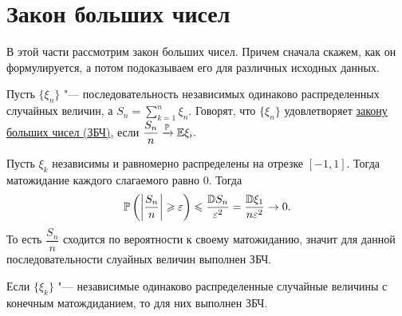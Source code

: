 \documentclass[../TV&MS.tex]{subfiles}
\begin{document}
    
\section{Закон больших чисел}
В этой части рассмотрим закон больших чисел. Причем сначала скажем, как он формулируется, а потом подоказываем его для различных исходных данных.

\begin{Def}
    Пусть $\{\xi_n\}$ "--- последовательность независимых одинаково распределенных случайных величин, а $S_n = \sum\limits_{k=1}^{n} \xi_n$.
    Говорят, что $\{\xi_n\}$ удовлетворяет \uline{закону больших чисел (ЗБЧ)}, если $\dfrac{S_n}{n} \xrightarrow[]{\mathbb{P}} \mathbb{E} \xi_i.$ 
\end{Def} 

\begin{Ex}
    Пусть $\xi_k$ независимы и равномерно распределены на отрезке $[-1, 1]$. Тогда матожидание каждого слагаемого равно $0$. Тогда
    \[
        \mathbb{P} \left( \left| \dfrac{S_n}{n} \right| \geqslant \varepsilon \right) \leqslant \dfrac{\mathbb{D} S_n}{\varepsilon^2} = \dfrac{\mathbb{D} \xi_1}{n \varepsilon^2} \rightarrow 0 
    .\]
    То есть $\dfrac{S_n}{n}$ сходится по вероятности к своему матожиданию, значит для данной последовательности слуайных величин выполнен ЗБЧ.
\end{Ex} 

\begin{Th}
    Если $\{ \xi_k \}$ "--- независимые одинаково распределенные случайные величины с конечным матождиданием, то для них выполнен ЗБЧ. 
\end{Th} 
\end{document}
